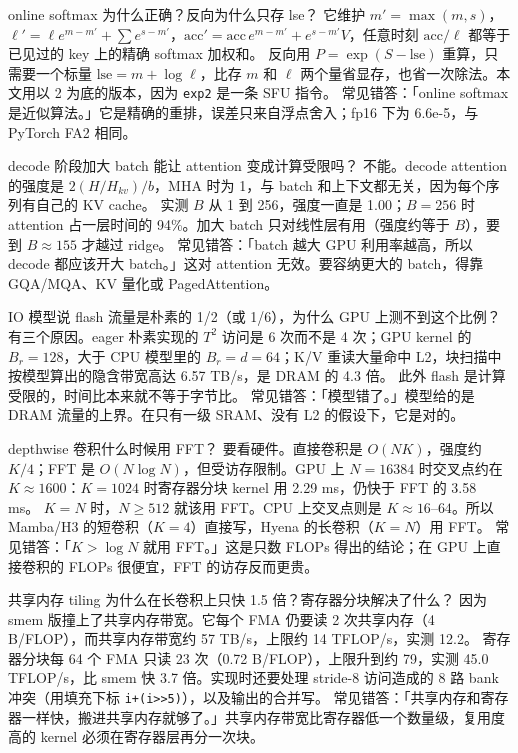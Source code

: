 \documentclass[11pt,a4paper]{ctexart}
\begin{document}
\begin{iqbox}{online softmax 为什么正确？反向为什么只存 lse？}
它维护 $m'=\max(m,s)$，$\ell'=\ell e^{m-m'}+\sum e^{s-m'}$，$\mathrm{acc}'=\mathrm{acc}\,e^{m-m'}+e^{s-m'}V$，任意时刻 $\mathrm{acc}/\ell$ 都等于已见过的 key 上的精确 softmax 加权和。
反向用 $P=\exp(S-\mathrm{lse})$ 重算，只需要一个标量 $\mathrm{lse}=m+\log\ell$，比存 $m$ 和 $\ell$ 两个量省显存，也省一次除法。本文用以 2 为底的版本，因为 \texttt{exp2} 是一条 SFU 指令。
\tcblower
常见错答：「online softmax 是近似算法。」它是精确的重排，误差只来自浮点舍入；fp16 下为 6.6e-5，与 PyTorch FA2 相同。
\end{iqbox}

\begin{iqbox}{decode 阶段加大 batch 能让 attention 变成计算受限吗？}
不能。decode attention 的强度是 $2(H/H_{kv})/b$，MHA 时为 1，与 batch 和上下文都无关，因为每个序列有自己的 KV cache。
实测 $B$ 从 1 到 256，强度一直是 1.00；$B=256$ 时 attention 占一层时间的 94\%。加大 batch 只对线性层有用（强度约等于 $B$），要到 $B\approx155$ 才越过 ridge。
\tcblower
常见错答：「batch 越大 GPU 利用率越高，所以 decode 都应该开大 batch。」这对 attention 无效。要容纳更大的 batch，得靠 GQA/MQA、KV 量化或 PagedAttention。
\end{iqbox}

\begin{iqbox}{IO 模型说 flash 流量是朴素的 1/2（或 1/6），为什么 GPU 上测不到这个比例？}
有三个原因。eager 朴素实现的 $T^2$ 访问是 6 次而不是 4 次；GPU kernel 的 $B_r=128$，大于 CPU 模型里的 $B_r=d=64$；K/V 重读大量命中 L2，块扫描中按模型算出的隐含带宽高达 6.57 TB/s，是 DRAM 的 4.3 倍。
此外 flash 是计算受限的，时间比本来就不等于字节比。
\tcblower
常见错答：「模型错了。」模型给的是 DRAM 流量的上界。在只有一级 SRAM、没有 L2 的假设下，它是对的。
\end{iqbox}

\begin{iqbox}{depthwise 卷积什么时候用 FFT？}
要看硬件。直接卷积是 $O(NK)$，强度约 $K/4$；FFT 是 $O(N\log N)$，但受访存限制。GPU 上 $N=16384$ 时交叉点约在 $K\approx1600$：$K=1024$ 时寄存器分块 kernel 用 2.29 ms，仍快于 FFT 的 3.58 ms。
$K=N$ 时，$N\ge512$ 就该用 FFT。CPU 上交叉点则是 $K\approx16$–$64$。所以 Mamba/H3 的短卷积（$K=4$）直接写，Hyena 的长卷积（$K=N$）用 FFT。
\tcblower
常见错答：「$K>\log N$ 就用 FFT。」这是只数 FLOPs 得出的结论；在 GPU 上直接卷积的 FLOPs 很便宜，FFT 的访存反而更贵。
\end{iqbox}

\begin{iqbox}{共享内存 tiling 为什么在长卷积上只快 1.5 倍？寄存器分块解决了什么？}
因为 smem 版撞上了共享内存带宽。它每个 FMA 仍要读 2 次共享内存（4 B/FLOP），而共享内存带宽约 57 TB/s，上限约 14 TFLOP/s，实测 12.2。
寄存器分块每 64 个 FMA 只读 23 次（0.72 B/FLOP），上限升到约 79，实测 45.0 TFLOP/s，比 smem 快 3.7 倍。实现时还要处理 stride-8 访问造成的 8 路 bank 冲突（用填充下标 \texttt{i+(i>>5)}），以及输出的合并写。
\tcblower
常见错答：「共享内存和寄存器一样快，搬进共享内存就够了。」共享内存带宽比寄存器低一个数量级，复用度高的 kernel 必须在寄存器层再分一次块。
\end{iqbox}
\end{document}
